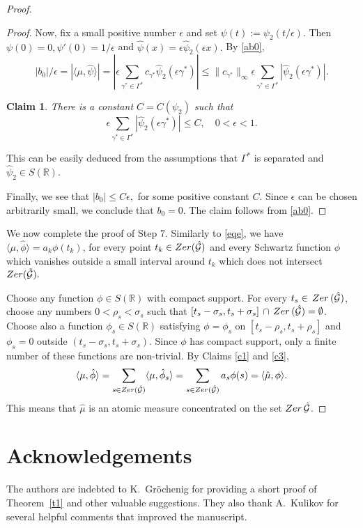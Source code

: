 \documentclass[12pt]{amsart}
\numberwithin{equation}{section}
\newtheorem{claim}[theorem]{Claim}
\newcommand{\R}{{\mathbb R}} \newcommand{\Q}{{\mathbb Q}} \newcommand{\Z}{{\mathbb Z}} \newcommand{\N}{{\mathbb N}}
\newcommand{\Zer}{{\rm Zer}}
\begin{document}
\begin{proof}
\begin{proof}
Now, fix a small positive number $\epsilon$ and set  $\psi(t):=\psi_2(t/\epsilon)$. Then $\psi(0)=0,\psi'(0)=1/\epsilon$ and $\hat\psi(x)=\epsilon\hat\psi_2(\epsilon x).$ By \eqref{ab0},
$$|b_0|/\epsilon=|\langle\mu,\hat\psi\rangle|=\left|\epsilon\sum_{\gamma^\ast\in\Gamma^\ast}c_{\gamma^\ast}\hat\psi_2(\epsilon  \gamma^\ast)\right|\leq \|c_{\gamma^\ast}\|_\infty \epsilon\sum_{\gamma^\ast\in\Gamma^\ast}|\hat\psi_2(\epsilon  \gamma^\ast)|.$$

\begin{claim}
  There is a constant $C=C(\psi_2)$ such that   $$\epsilon\sum_{\gamma^\ast\in\Gamma^\ast}|\hat\psi_2(\epsilon  \gamma^\ast)|\leq C,\quad 0<\epsilon<1.$$
\end{claim}

This can be easily deduced from the assumptions that $\Gamma^\ast$ is separated and $\hat\psi_2\in S(\R)$.

Finally, we see that $|b_0|\leq C\epsilon,$ for some positive constant $C.$
 Since $\epsilon$ can be chosen arbitrarily small, we conclude that $b_0=0.$   The claim follows from \eqref{ab0}.
\end{proof}

We now complete the proof of Step 7.
Similarly to \eqref{eqe}, we have $\langle\mu,\hat\phi\rangle=a_k\phi(t_k)$, for every point $t_k\in \Zer(\hat\Ff)$ and every Schwartz function $\phi$ which vanishes outside a small interval around $t_k$ which does not intersect $\Zer(\hat\Ff).$ 

Choose any function $\phi\in S(\R)$ with compact support. For every $t_s\in\,\Zer\,(\hat\Ff)$, choose any numbers $0<\rho_s<\sigma_s$  such that $[t_s-\sigma_s,t_s+\sigma_s]\,\cap\,\Zer\,(\hat\Ff)=\emptyset$. Choose also a function $\phi_s\in S(\R)$ satisfying $\phi=\phi_s$ on $[t_s-\rho_s,t_s+\rho_s]$ and $\phi_s=0$ outside $(t_s-\sigma_s,t_s+\sigma_s).$ Since $\phi$ has compact support, only a finite number of these functions are non-trivial. By Claims \ref{c1} and \ref{c3},
$$\langle\mu,\hat\phi\rangle=\sum_{s\in \Zer(\hat\Ff)}\langle\mu,\hat\phi_s\rangle=\sum_{s\in \Zer(\hat\Ff)}a_s\phi(s)=\langle\hat\mu,\phi\rangle.$$ This means that $\hat\mu$ is an atomic measure concentrated on the set $\Zer\,\hat\Ff$.
\end{proof}


\section{Acknowledgements}
The authors are indebted to K.~Gr\"{o}chenig for providing a short proof of Theorem~\ref{t1} and other valuable suggestions. They also thank A.~Kulikov for several helpful comments that improved the manuscript.
\end{document}
